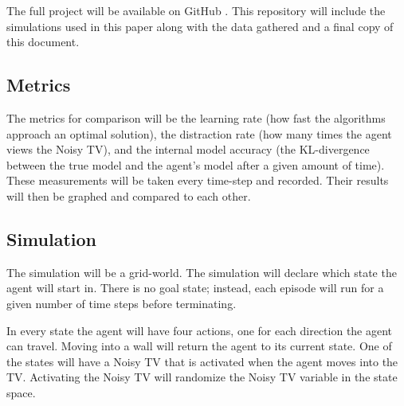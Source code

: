 \documentclass[12pt]{thesis}
\begin{document}
The full project will be available on GitHub \cite{TPIG:github}. This repository will include the simulations used in this paper along with the data gathered and a final copy of this document.

\subsection{Metrics}
The metrics for comparison will be the learning rate (how fast the algorithms approach an optimal solution), the distraction rate (how many times the agent views the Noisy TV), and the internal model accuracy (the KL-divergence between the true model and the agent's model after a given amount of time). These measurements will be taken every time-step and recorded. Their results will then be graphed and compared to each other.


\subsection{Simulation}
The simulation will be a grid-world. The simulation will declare which state the agent will start in. There is no goal state; instead, each episode will run for a given number of time steps before terminating.

In every state the agent will have four actions, one for each direction the agent can travel. Moving into a wall will return the agent to its current state. One of the states will have a Noisy TV that is activated when the agent moves into the TV. Activating the Noisy TV will randomize the Noisy TV variable in the state space.
\end{document}
